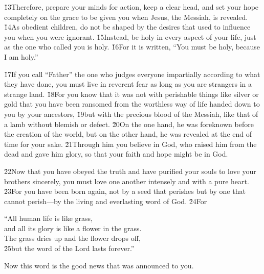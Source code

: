 \v{13}Therefore, prepare your minds for action, keep a clear head, and set your hope completely on the grace to be given you when Jesus, the Messiah, is revealed. \v{14}As obedient children, do not be shaped by the desires that used to influence you when you were ignorant. \v{15}Instead, be holy in every aspect of your life, just as the one who called you is holy. \v{16}For it is written, ``You must be holy, because I am holy.''

\v{17}If you call ``Father'' the one who judges everyone impartially according to what they have done, you must live in reverent fear as long as you are strangers in a strange land. \v{18}For you know that it was not with perishable things like silver or gold that you have been ransomed from the worthless way of life handed down to you by your ancestors, \v{19}but with the precious blood of the Messiah, like that of a lamb without blemish or defect. \v{20}On the one hand, he was foreknown before the creation of the world, but on the other hand, he was revealed at the end of time for your sake. \v{21}Through him you believe in God, who raised him from the dead and gave him glory, so that your faith and hope might be in God.

\v{22}Now that you have obeyed the truth and have purified your souls to love your brothers sincerely, you must love one another intensely and with a pure heart. \v{23}For you have been born again, not by a seed that perishes but by one that cannot perish---by the living and everlasting word of God. \v{24}For

\begin{poetry}
\poeml ``All human life is like grass, \\
\poemll    and all its glory is like a flower in the grass. \\
\poeml The grass dries up and the flower drops off, \\
\poeml \v{25}but the word of the Lord lasts forever.''
\end{poetry}

Now this word is the good news that was announced to you.

